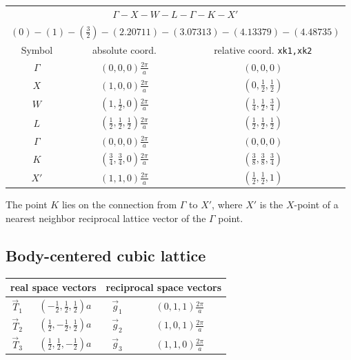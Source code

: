\documentclass[final,12pt]{article}
\begin{document}
{{{{{{\begin{center}
\renewcommand\arraystretch{1.5}
\begin{tabular}{|c|c|c|}
\hline
\multicolumn{3}{|c|}{$\Gamma-X-W-L-\Gamma-K-X'$}\\
\multicolumn{3}{|c|}{$(0)-(1)-(\frac{3}{2})-(2.20711)-(3.07313)-(4.13379)-(4.48735)$}\\
\hline
Symbol & absolute coord. & relative coord. \texttt{xk1,xk2}\\
\hline
$\Gamma$   & $(0,0,0) \frac{2\pi}{a}$ & $(0,0,0)$ \\ 
$X$        & $(1,0,0) \frac{2\pi}{a}$ & $(0,\frac{1}{2},\frac{1}{2})$ \\ 
$W$        & $(1,\frac{1}{2},0) \frac{2\pi}{a}$ & $(\frac{1}{4},\frac{1}{2},\frac{3}{4})$ \\ 
$L$        & $(\frac{1}{2},\frac{1}{2},\frac{1}{2}) \frac{2\pi}{a}$ & $(\frac{1}{2},\frac{1}{2},\frac{1}{2})$ \\ 
$\Gamma$   & $(0,0,0) \frac{2\pi}{a}$ & $(0,0,0)$ \\ 
$K$        & $(\frac{3}{4},\frac{3}{4},0) \frac{2\pi}{a}$ & $(\frac{3}{8},\frac{3}{8},\frac{3}{4})$ \\ 
$X'$       & $(1,1,0) \frac{2\pi}{a}$ & $(\frac{1}{2},\frac{1}{2},1)$ \\ 
\hline
\end{tabular}
\renewcommand\arraystretch{1.}
\end{center}
The point $K$ lies on the connection from $\Gamma$ to $X'$, where $X'$
is the $X$-point of a nearest neighbor reciprocal lattice vector of the
$\Gamma$ point.

\subsection{Body-centered cubic lattice}
\begin{center}
\renewcommand\arraystretch{1.5}
\begin{tabular}{||c|c||c|c||}
\hline
\multicolumn{2}{|c|}{real space vectors} &
\multicolumn{2}{|c|}{reciprocal space vectors} \\
\hline
$\vec{T}_1$ & $(-\frac{1}{2},\frac{1}{2},\frac{1}{2}) a$ &
$\vec{g}_1$ & $(0,1,1)\frac{2\pi}{a}$ \\
$\vec{T}_2$ & $(\frac{1}{2},-\frac{1}{2},\frac{1}{2}) a$ &
$\vec{g}_2$ & $(1,0,1)\frac{2\pi}{a}$ \\
$\vec{T}_3$ & $(\frac{1}{2},\frac{1}{2},-\frac{1}{2}) a$ &
$\vec{g}_3$ & $(1,1,0)\frac{2\pi}{a}$ \\
\hline
\end{tabular}
\renewcommand\arraystretch{1.}
\end{center}

}}}}}}
\end{document}
